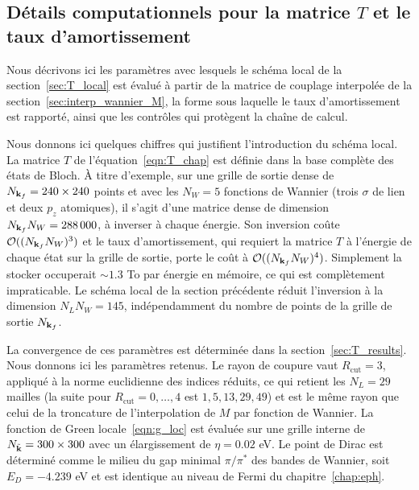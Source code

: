 \subsection{Détails computationnels pour la matrice $T$ et le taux d'amortissement}\label{sec:T_détails}

Nous décrivons ici les paramètres avec lesquels le schéma local de la section~\ref{sec:T_local} est évalué à partir de la matrice de couplage interpolée de la section~\ref{sec:interp_wannier_M}, la forme sous laquelle le taux d'amortissement est rapporté, ainsi que les contrôles qui protègent la chaîne de calcul.


Nous donnons ici quelques chiffres qui justifient l'introduction du schéma local. La matrice $T$ de l'équation~\eqref{eqn:T_chap} est définie dans la base complète des états de Bloch. À titre d'exemple, sur une grille de sortie dense de $N_{\mathbf{k}_f} = 240\times 240$ points et avec les $N_W=5$ fonctions de Wannier (trois $\sigma$ de lien et deux $p_z$ atomiques), il s'agit d'une matrice dense de dimension $N_{\mathbf{k}_f}N_W=288\,000$, à inverser à chaque énergie. Son inversion coûte $\mathcal{O}((N_{\mathbf{k}_f}N_W)^3)$ et le taux d'amortissement, qui requiert la matrice $T$ à l'énergie de chaque état sur la grille de sortie, porte le coût à $\mathcal{O}((N_{\mathbf{k}_f}N_W)^4)$. Simplement la stocker occuperait $\sim 1.3$ To par énergie en mémoire, ce qui est complètement impraticable. Le schéma local de la section précédente réduit l'inversion à la dimension $N_LN_W=145$, indépendamment du nombre de points de la grille de sortie $N_{\mathbf{k}_f}$.


La convergence de ces paramètres est déterminée dans la section~\ref{sec:T_results}. Nous donnons ici les paramètres retenus. Le rayon de coupure vaut $R_\text{cut}=3$, appliqué à la norme euclidienne des indices réduits, ce qui retient les $N_L=29$ mailles (la suite pour $R_\text{cut}=0,\dots,4$ est $1, 5, 13, 29, 49$) et est le même rayon que celui de la troncature de l'interpolation de $M$ par fonction de Wannier. La fonction de Green locale~\eqref{eqn:g_loc} est évaluée sur une grille interne de $N_{\tilde{\mathbf{k}}}=300\times 300$ avec un élargissement de $\eta=0.02$ eV. Le point de Dirac est déterminé comme le milieu du gap minimal $\pi/\pi^*$ des bandes de Wannier, soit $E_D=-4.239$ eV et est identique au niveau de Fermi du chapitre~\ref{chap:eph}.


